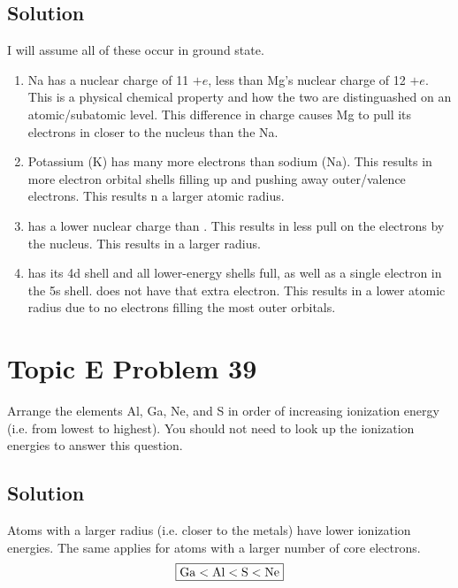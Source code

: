 \documentclass[10pt]{article}
\begin{document}
        \subsection{Solution}
            I will assume all of these occur in ground state.
            \begin{enumerate}[label=\alph*/]
                \item   Na has a nuclear charge of 11 $+e$, less than Mg's nuclear charge of 12 $+e$. This is a physical chemical property and how the two are distinguashed on an atomic/subatomic level. This difference in charge causes Mg to pull its electrons in closer to the nucleus than the Na.
                \item   Potassium (K) has many more electrons than sodium (Na). This results in more electron orbital shells filling up and pushing away outer/valence electrons. This results n a larger atomic radius.
                \item   {} has a lower nuclear charge than . This results in less pull on the electrons by the nucleus. This results in a larger radius.
                \item   {} has its 4d shell and all lower-energy shells full, as well as a single electron in the 5s shell.  does not have that extra electron. This results in a lower atomic radius due to no electrons filling the most outer orbitals.
            \end{enumerate}
        

    \pagebreak
    \section{Topic E Problem 39}
        Arrange the elements Al, Ga, Ne, and S in order of increasing ionization energy (i.e. from lowest to highest). 
        You should not need to look up the ionization energies to answer this question.

        \subsection{Solution}
            Atoms with a larger radius (i.e. closer to the metals) have lower ionization energies.
            The same applies for atoms with a larger number of core electrons.
            \begin{equation}
                \boxed{\rm Ga < Al < S < Ne}
            \end{equation}
\end{document}
